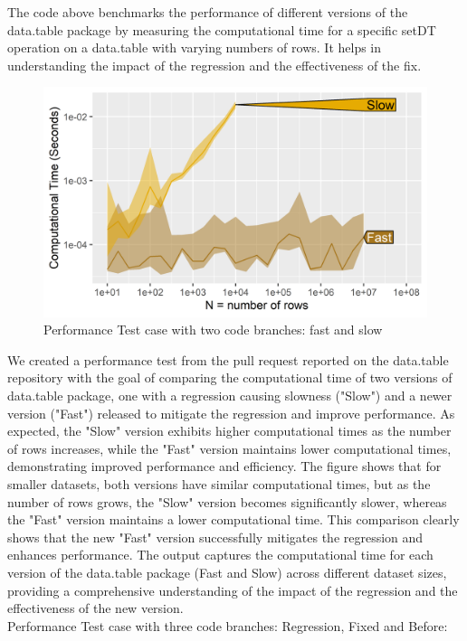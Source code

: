 \noindent The code above benchmarks the performance of different versions of the data.table package by measuring the computational time for a specific setDT operation on a data.table with varying numbers of rows. It helps in understanding the impact of the regression and the effectiveness of the fix. \\


\begin{figure}[H]
    \centering
    \includegraphics[width=0.6\linewidth]{figures/atime.list.5427.png}
    \caption{Performance Test case with two code branches: fast and slow}
    \label{fig:label3}
\end{figure}

\noindent We created a performance test from the pull request reported on the data.table repository with the goal of comparing the computational time of two versions of data.table package, one with a regression causing slowness ("Slow") and a newer version ("Fast") released to mitigate the regression and improve performance. As expected, the "Slow" version exhibits higher computational times as the number of rows increases, while the "Fast" version maintains lower computational times, demonstrating improved performance and efficiency. The figure shows that for smaller datasets, both versions have similar computational times, but as the number of rows grows, the "Slow" version becomes significantly slower, whereas the "Fast" version maintains a lower computational time. This comparison clearly shows that the new "Fast" version successfully mitigates the regression and enhances performance. The output captures the computational time for each version of the data.table package (Fast and Slow) across different dataset sizes, providing a comprehensive understanding of the impact of the regression and the effectiveness of the new version.\\

\noindent Performance Test case with three code branches: Regression, Fixed and Before: \\

